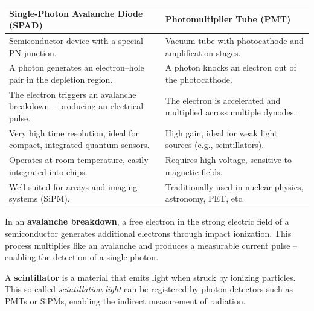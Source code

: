 \begin{tcolorbox}[hinweisbox, title=Didactic Comparison: SPAD vs. PMT]
	\label{box:vergleich SPAD}
	\small
	\begin{tabular}{p{} | p{}}
		\textbf{Single-Photon Avalanche Diode (SPAD)} & \textbf{Photomultiplier Tube (PMT)} \\
		\hline
		Semiconductor device with a special PN junction\index{PN junction}. & Vacuum tube\index{Vacuum tube} with photocathode and amplification stages. \\
		\hline
		A photon generates an electron–hole pair\index{Electron–hole pair} in the depletion region\index{Depletion region}. & A photon knocks an electron out of the photocathode. \\
		\hline
		The electron triggers an avalanche breakdown\index{Avalanche breakdown} – producing an electrical pulse. & The electron is accelerated and multiplied across multiple dynodes. \\
		\hline
		Very high time resolution\index{Time resolution}, ideal for compact, integrated quantum sensors\index{Quantum sensor}. & High gain, ideal for weak light sources (e.g., scintillators\index{Scintillator}). \\
		\hline
		Operates at room temperature\index{Room temperature}, easily integrated into chips\index{Chip}. & Requires high voltage, sensitive to magnetic fields. \\
		\hline
		Well suited for arrays and imaging systems (SiPM). & Traditionally used in nuclear physics\index{Nuclear physics}, astronomy, PET\index{Positron emission tomography}, etc. \\
	\end{tabular}
\end{tcolorbox}
\begin{tcolorbox}[didaktikbox, title=Concept: Avalanche Breakdown]
	\label{box:avalanche}
	\small
	In an \textbf{avalanche breakdown}, a free electron in the strong electric field of a semiconductor generates additional electrons through impact ionization. This process multiplies like an avalanche and produces a measurable current pulse – enabling the detection of a single photon.
\end{tcolorbox}
\vspace{1em}
\begin{tcolorbox}[didaktikbox, title=Concept: Scintillator]
	\label{box:szintillator}
	\small
	A \textbf{scintillator} is a material that emits light when struck by ionizing particles. This so-called \emph{scintillation light} can be registered by photon detectors such as PMTs or SiPMs, enabling the indirect measurement of radiation.
\end{tcolorbox}

